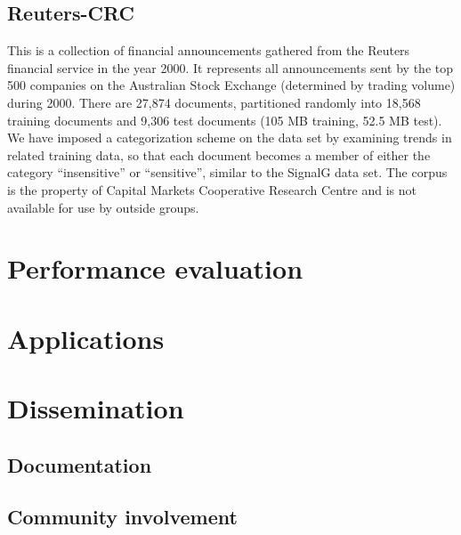 \subsection{Reuters-CRC}
This is a collection of financial announcements gathered from the
Reuters financial service in the year 2000.  It represents all
announcements sent by the top 500 companies on the Australian Stock
Exchange (determined by trading volume) during 2000.  There are 27,874
documents, partitioned randomly into 18,568 training documents and
9,306 test documents (105 MB training, 52.5 MB test).  We have imposed
a categorization scheme on the data set by examining trends in related
training data, so that each document becomes a member of either the
category ``insensitive'' or ``sensitive'', similar to the SignalG data
set.  The corpus is the property of Capital Markets Cooperative
Research Centre and is not available for use by outside groups.


\section{Performance evaluation}

\section{Applications}


\section{Dissemination}
\subsection{Documentation}
\subsection{Community involvement}
